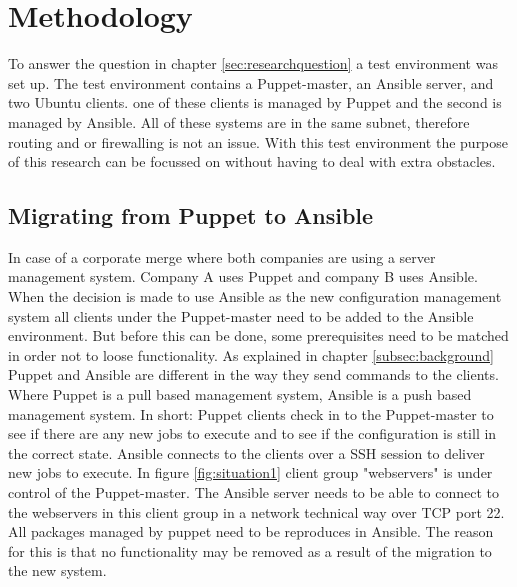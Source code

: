 \section{Methodology}\label{sec:methodology}

To answer the question in chapter \ref{sec:researchquestion} a test environment was set up. The test environment contains a Puppet-master, an Ansible server, and two Ubuntu clients. one of these clients is managed by Puppet and the second is managed by Ansible. All of these systems are in the same subnet, therefore routing and or firewalling is not an issue. With this test environment the purpose of this research can be focussed on without having to deal with extra obstacles.  

\subsection{Migrating from Puppet to Ansible}\label{subsec:puppettoansible}

In case of a corporate merge where both companies are using a server management system. Company A uses Puppet and company B uses Ansible. When the decision is made to use Ansible as the new configuration management system all clients under the Puppet-master need to be added to the Ansible environment. But before this can be done, some prerequisites need to be matched in order not to loose functionality.
As explained in chapter \ref{subsec:background} Puppet and Ansible are different in the way they send commands to the clients. Where Puppet is a pull based management system, Ansible is a push based management system. In short: Puppet clients check in to the Puppet-master to see if there are any new jobs to execute and to see if the configuration is still in the correct state. Ansible connects to the clients over a SSH session to deliver new jobs to execute. In figure \ref{fig:situation1} client group "webservers" is under control of the Puppet-master. The Ansible server needs to be able to connect to the webservers in this client group in a network technical way over TCP port 22. All packages managed by puppet need to be reproduces in Ansible. The reason for this is that no functionality may be removed as a result of the migration to the new system. 

